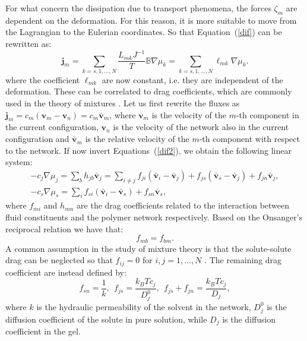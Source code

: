 \documentclass[runningheads]{llncs}
\begin{document}
For what concern the dissipation due to transport phenomena, the forces $\zeta_m$ are dependent on the deformation. For this reason, it is more suitable to move from the Lagrangian to the Eulerian coordinates. So that Equation~(\ref{dif}) can be rewritten as:
\begin{equation}
\mathbf{j}_m = \sum_{k=s,1,\ldots,N} \frac{L_{mk}J^{-1}}{T} \mathbb{B}\nabla \mu_k= \sum_{k=s,1,\ldots,N} \ell_{mk} \nabla \mu_k. \label{dif2}
\end{equation}
where the coefficient $\ell_{mk}$ are now constant, i.e. they are independent of the deformation. These can be correlated to drag coefficients, which are commonly used in the theory of mixtures \cite{ecm1,ecm2}. Let us first rewrite the fluxes as $\mathbf{j}_m = c_m (\mathbf{v}_m-\mathbf{v}_n)= c_m \bar{\mathbf{v}}_{m}$, where $\mathbf{v}_m$ is the velocity of the $m$-th component in the current configuration, $\mathbf{v}_n$ is the velocity of the network also in the current configuration and  $\bar{\mathbf{v}}_{m}$ is the relative velocity of the $m$-th component with respect to the network. If now invert Equations~(\ref{dif2}), we obtain the following linear system:
\begin{eqnarray}
-c_j \nabla \mu_j = \sum_b h_{jb} \bar{\mathbf{v}}_j= \sum_{i\neq j} f_{ji} \left(\bar{\mathbf{v}}_i-\bar{\mathbf{v}}_j\right) + f_{js} (\bar{\mathbf{v}}_s-\bar{\mathbf{v}}_j) + f_{jn} \bar{\mathbf{v}}_j,\label{drag1}\\
-c_s \nabla \mu_s = \sum_i f_{si} \left(\bar{\mathbf{v}}_i-\bar{\mathbf{v}}_s\right)+ f_{sn} \bar{\mathbf{v}}_s,
\end{eqnarray}
where $f_{mi}$ and $h_{mn}$ are the drag coefficients related to the interaction between fluid constituents and the polymer network respectively. Based on the Onsanger's reciprocal relation we have that:
\begin{equation}
f_{mb}=f_{bm}.
\end{equation}
A common assumption in the study of mixture theory is that the solute-solute drag can be neglected so that $f_{ij}=0$ for $i,j=1,\ldots,N$ \cite{ecm1,bookbiophys}. The remaining drag coefficient are instead defined by:
\begin{equation}
f_{sn} = \frac{1}{k}, \ \ f_{js}=\frac{k_BT c_j}{D^0_{j}},\ \  f_{js}+f_{jn}= \frac{k_BT c_j}{D_j}, \label{drag2}
\end{equation}
where $k$ is the hydraulic permeability of the solvent in the network, $D^0_j$ is the diffusion coefficient of the solute in pure solution, while $D_j$ is the diffusion coefficient in the gel.
\end{document}
